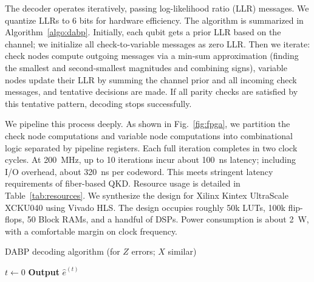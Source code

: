 \documentclass[conference]{IEEEtran}  %
\begin{document}
The decoder operates iteratively, passing log-likelihood ratio (LLR) messages. We quantize LLRs to 6 bits for hardware efficiency. The algorithm is summarized in Algorithm~\ref{algo:dabp}. Initially, each qubit gets a prior LLR based on the channel; we initialize all check-to-variable messages as zero LLR. Then we iterate: check nodes compute outgoing messages via a min-sum approximation (finding the smallest and second-smallest magnitudes and combining signs), variable nodes update their LLR by summing the channel prior and all incoming check messages, and tentative decisions are made. If all parity checks are satisfied by this tentative pattern, decoding stops successfully.

We pipeline this process deeply. As shown in Fig.~\ref{fig:fpga}, we partition the check node computations and variable node computations into combinational logic separated by pipeline registers. Each full iteration completes in two clock cycles. At 200~MHz, up to 10 iterations incur about 100~ns latency; including I/O overhead, about 320~ns per codeword. This meets stringent latency requirements of fiber-based QKD. Resource usage is detailed in Table~\ref{tab:resources}. We synthesize the design for Xilinx Kintex UltraScale XCKU040 using Vivado HLS. The design occupies roughly 50k LUTs, 100k flip-flops, 50 Block RAMs, and a handful of DSPs. Power consumption is about 2~W, with a comfortable margin on clock frequency.

\begin{algorithm}[t]
\DontPrintSemicolon
\caption{DABP decoding algorithm (for $Z$ errors; $X$ similar)}\label{algo:dabp}
$t \gets 0$ \;
\textbf{Output} $\hat{e}^{(t)}$ \;
\end{algorithm}
\end{document}
